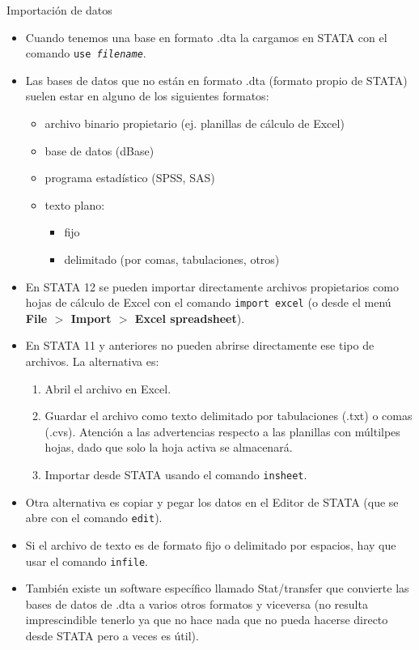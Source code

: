 \documentclass{beamer}
\begin{document}
\begin{frame}[allowframebreaks]{Importación de datos}
\begin{itemize}
\item Cuando tenemos una base en formato .dta la cargamos en STATA con el comando \texttt{use \textit{filename}}.
\item Las bases de datos que no están en formato .dta (formato propio de  STATA) suelen estar en alguno de los siguientes formatos:
\begin{itemize}
\item archivo binario propietario (ej. planillas de cálculo de Excel)
\item base de datos (dBase)
\item programa estadístico (SPSS, SAS)
\item texto plano:
\begin{itemize}
\item fijo 
\item delimitado (por comas, tabulaciones, otros)
\end{itemize}
\end{itemize}
\item En STATA 12 se pueden importar directamente archivos propietarios como hojas de cálculo de Excel con el comando \texttt{import excel} (o desde el menú \textbf{File $>$ Import $>$ Excel spreadsheet}).
\item En STATA 11 y anteriores no pueden abrirse directamente ese tipo de archivos. La alternativa es: 
\begin{enumerate}
\item Abril el archivo en Excel. 
\item Guardar el archivo como texto delimitado por tabulaciones (.txt) o comas (.cvs). Atención a las advertencias respecto a las planillas con múltilpes hojas, dado que solo la hoja activa se almacenará. 
\item Importar desde STATA usando el comando \texttt{insheet}.
\end{enumerate}
\item Otra alternativa es copiar y pegar los datos en el Editor de STATA (que se abre con el comando \texttt{edit}).
\item Si el archivo de texto es de formato fijo o delimitado por espacios, hay que usar el comando \texttt{infile}.
\item También existe un software específico llamado Stat/transfer que convierte las bases de datos de .dta a varios otros formatos y viceversa (no resulta imprescindible tenerlo ya que no hace nada que no pueda hacerse directo desde STATA pero a veces es útil).
\end{itemize}
\end{frame}
\end{document}

